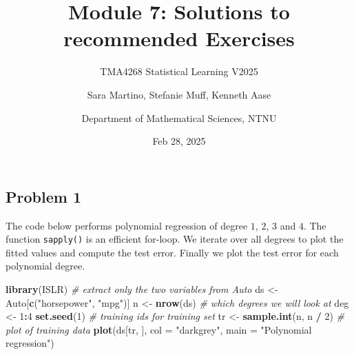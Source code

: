 \documentclass[
]{article}
\title{Module 7: Solutions to recommended Exercises}
\subtitle{TMA4268 Statistical Learning V2025}
\author{Sara Martino, Stefanie Muff, Kenneth Aase \and Department of
Mathematical Sciences, NTNU}
\date{Feb 28, 2025}
\newenvironment{Shaded}{\begin{snugshade}}{\end{snugshade}}
\newcommand{\AttributeTok}[1]{\textcolor[rgb]{0.13,0.29,0.53}{#1}}
\newcommand{\CommentTok}[1]{\textcolor[rgb]{0.56,0.35,0.01}{\textit{#1}}}
\newcommand{\DecValTok}[1]{\textcolor[rgb]{0.00,0.00,0.81}{#1}}
\newcommand{\FunctionTok}[1]{\textcolor[rgb]{0.13,0.29,0.53}{\textbf{#1}}}
\newcommand{\NormalTok}[1]{#1}
\newcommand{\OtherTok}[1]{\textcolor[rgb]{0.56,0.35,0.01}{#1}}
\newcommand{\SpecialCharTok}[1]{\textcolor[rgb]{0.81,0.36,0.00}{\textbf{#1}}}
\newcommand{\StringTok}[1]{\textcolor[rgb]{0.31,0.60,0.02}{#1}}
\begin{document}
\maketitle

\subsection{Problem 1}\label{problem-1}

The code below performs polynomial regression of degree \(1\), \(2\),
\(3\) and \(4\). The function \texttt{sapply()} is an efficient
for-loop. We iterate over all degrees to plot the fitted values and
compute the test error. Finally we plot the test error for each
polynomial degree.

\begin{Shaded}
\begin{Highlighting}[]
\FunctionTok{library}\NormalTok{(ISLR)}
\CommentTok{\# extract only the two variables from Auto}
\NormalTok{ds }\OtherTok{\textless{}{-}}\NormalTok{ Auto[}\FunctionTok{c}\NormalTok{(}\StringTok{"horsepower"}\NormalTok{, }\StringTok{"mpg"}\NormalTok{)]}
\NormalTok{n }\OtherTok{\textless{}{-}} \FunctionTok{nrow}\NormalTok{(ds)}
\CommentTok{\# which degrees we will look at}
\NormalTok{deg }\OtherTok{\textless{}{-}} \DecValTok{1}\SpecialCharTok{:}\DecValTok{4}
\FunctionTok{set.seed}\NormalTok{(}\DecValTok{1}\NormalTok{)}
\CommentTok{\# training ids for training set}
\NormalTok{tr }\OtherTok{\textless{}{-}} \FunctionTok{sample.int}\NormalTok{(n, n }\SpecialCharTok{/} \DecValTok{2}\NormalTok{)}
\CommentTok{\# plot of training data}
\FunctionTok{plot}\NormalTok{(ds[tr, ], }\AttributeTok{col =} \StringTok{"darkgrey"}\NormalTok{, }\AttributeTok{main =} \StringTok{"Polynomial regression"}\NormalTok{)}


\end{Highlighting}
\end{Shaded}
\end{document}

